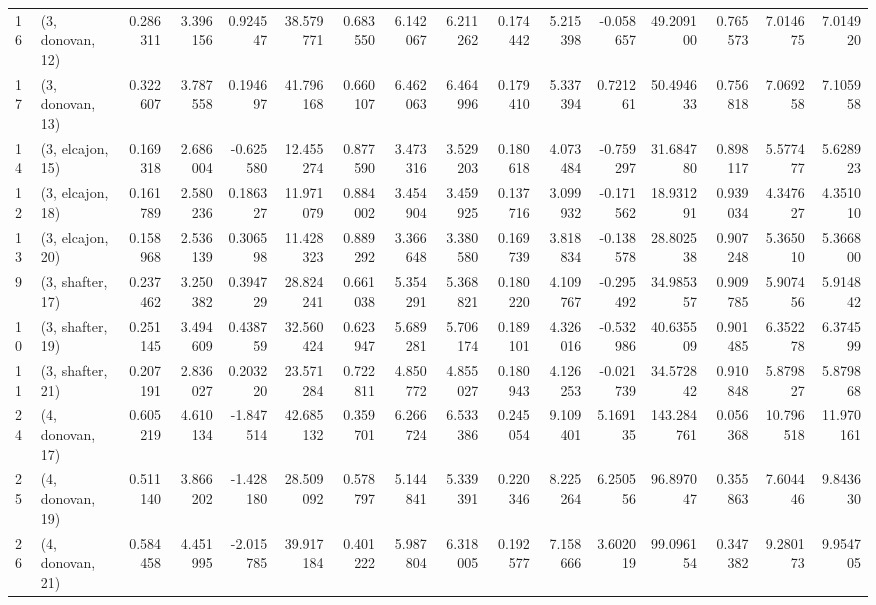 \begin{tabular}{llrrrrrrrrrrrrrr}
16 &  (3, donovan, 12) &   0.286311 &  3.396156 &  0.924547 &   38.579771 &  0.683550 &   6.142067 &   6.211262 &  0.174442 &  5.215398 & -0.058657 &   49.209100 &  0.765573 &   7.014675 &   7.014920 \\
17 &  (3, donovan, 13) &   0.322607 &  3.787558 &  0.194697 &   41.796168 &  0.660107 &   6.462063 &   6.464996 &  0.179410 &  5.337394 &  0.721261 &   50.494633 &  0.756818 &   7.069258 &   7.105958 \\
14 &  (3, elcajon, 15) &   0.169318 &  2.686004 & -0.625580 &   12.455274 &  0.877590 &   3.473316 &   3.529203 &  0.180618 &  4.073484 & -0.759297 &   31.684780 &  0.898117 &   5.577477 &   5.628923 \\
12 &  (3, elcajon, 18) &   0.161789 &  2.580236 &  0.186327 &   11.971079 &  0.884002 &   3.454904 &   3.459925 &  0.137716 &  3.099932 & -0.171562 &   18.931291 &  0.939034 &   4.347627 &   4.351010 \\
13 &  (3, elcajon, 20) &   0.158968 &  2.536139 &  0.306598 &   11.428323 &  0.889292 &   3.366648 &   3.380580 &  0.169739 &  3.818834 & -0.138578 &   28.802538 &  0.907248 &   5.365010 &   5.366800 \\
9  &  (3, shafter, 17) &   0.237462 &  3.250382 &  0.394729 &   28.824241 &  0.661038 &   5.354291 &   5.368821 &  0.180220 &  4.109767 & -0.295492 &   34.985357 &  0.909785 &   5.907456 &   5.914842 \\
10 &  (3, shafter, 19) &   0.251145 &  3.494609 &  0.438759 &   32.560424 &  0.623947 &   5.689281 &   5.706174 &  0.189101 &  4.326016 & -0.532986 &   40.635509 &  0.901485 &   6.352278 &   6.374599 \\
11 &  (3, shafter, 21) &   0.207191 &  2.836027 &  0.203220 &   23.571284 &  0.722811 &   4.850772 &   4.855027 &  0.180943 &  4.126253 & -0.021739 &   34.572842 &  0.910848 &   5.879827 &   5.879868 \\
24 &  (4, donovan, 17) &   0.605219 &  4.610134 & -1.847514 &   42.685132 &  0.359701 &   6.266724 &   6.533386 &  0.245054 &  9.109401 &  5.169135 &  143.284761 &  0.056368 &  10.796518 &  11.970161 \\
25 &  (4, donovan, 19) &   0.511140 &  3.866202 & -1.428180 &   28.509092 &  0.578797 &   5.144841 &   5.339391 &  0.220346 &  8.225264 &  6.250556 &   96.897047 &  0.355863 &   7.604446 &   9.843630 \\
26 &  (4, donovan, 21) &   0.584458 &  4.451995 & -2.015785 &   39.917184 &  0.401222 &   5.987804 &   6.318005 &  0.192577 &  7.158666 &  3.602019 &   99.096154 &  0.347382 &   9.280173 &   9.954705 \\

\end{tabular}

